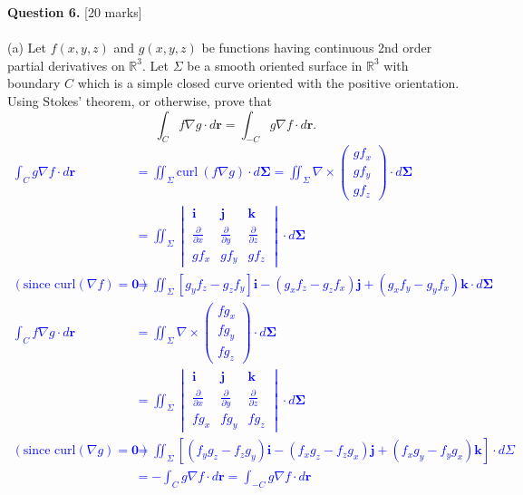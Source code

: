 \documentclass[12pt]{article}
\newcommand{\R}{\mathbb{R}}
\begin{document}
{\bf Question 6.} [20 marks]\\
\\\indent
(a) Let $f(x,y,z)$ and $g(x,y,z)$ be functions having continuous 2nd order partial derivatives on $\R^3$. Let $\Sigma$ be a smooth oriented surface in $\R^3$ with boundary $C$ which is a simple closed curve oriented with the positive orientation. Using Stokes' theorem, or otherwise, prove that
\[
\int_C f\nabla g\cdot d\mathbf{r}=\int_{-C}g\nabla f\cdot d\mathbf{r}.
\]
\textcolor{blue}{
\begin{align*}
	\int_{C}g\nabla f\cdot d\mathbf{r}&=\iint_\Sigma\text{curl}\ (f\nabla g)\cdot d\mathbf{\Sigma}=\iint_\Sigma\nabla\times\begin{pmatrix}
		gf_x\\gf_y\\gf_z
	\end{pmatrix}\cdot d\mathbf{\Sigma}\\
	&=\iint_\Sigma\begin{vmatrix}
		\mathbf{i}&\mathbf{j}&\mathbf{k}\\
		\frac{\partial}{\partial x}&\frac{\partial}{\partial y}&\frac{\partial}{\partial z}\\
		gf_x&gf_y&gf_z
	\end{vmatrix}\cdot d\mathbf{\Sigma}\\
	(\text{since curl}(\nabla f)=\mathbf{0})&=\iint_\Sigma[g_yf_z-g_zf_y]\mathbf{i}-(g_xf_z-g_zf_x)\mathbf{j}+(g_xf_y-g_yf_x)\mathbf{k}\cdot d\mathbf{\Sigma}\\
	\int_C f\nabla g\cdot d\mathbf{r}&=\iint_\Sigma\nabla\times\begin{pmatrix}
		fg_x\\fg_y\\fg_z
	\end{pmatrix}\cdot d\mathbf{\Sigma}\\
	&=\iint_\Sigma\begin{vmatrix}
		\mathbf{i}&\mathbf{j}&\mathbf{k}\\
		\frac{\partial}{\partial x}&\frac{\partial}{\partial y}&\frac{\partial}{\partial z}\\
		fg_x&fg_y&fg_z
	\end{vmatrix}\cdot d\mathbf{\Sigma}\\
	(\text{since curl}(\nabla g)=\mathbf{0}) &=\iint_\Sigma [(f_yg_z-f_zg_y)\mathbf{i}-(f_xg_z-f_zg_x)\mathbf{j}+(f_xg_y-f_yg_x)\mathbf{k}]\cdot d\Sigma\\
	&=-\int_{C}g\nabla f\cdot d\mathbf{r}=\int_{-C}g\nabla f\cdot d\mathbf{r}
\end{align*}
}
\end{document}
